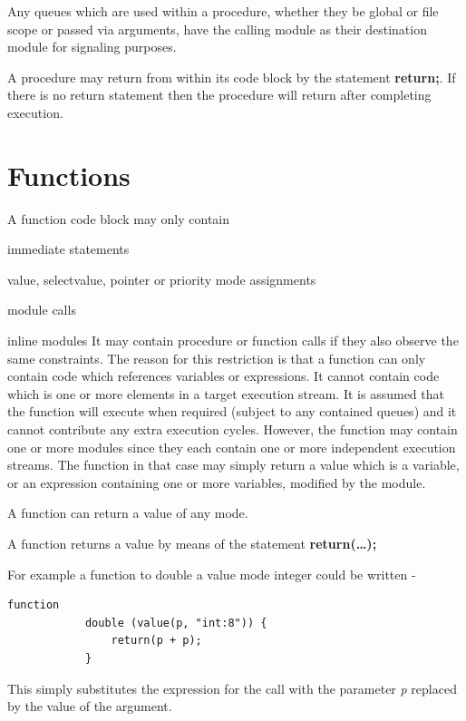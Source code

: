        Any queues which are used within a procedure, whether they be global or
        file scope or passed via arguments, have the calling module as their
        destination module for signaling purposes.
        
        A procedure may return from within its code block by the
        statement {\bf return;}. If there is no return statement then the procedure
        will return after completing execution.
        








    \section{Functions}


        A function code block may only contain
        \blist
        \item   immediate statements
        \item   value, selectvalue, pointer or priority mode assignments
        \item   module calls
        \item   inline modules
        \blend
        It may contain procedure or function calls if they also observe the
        same constraints. The reason for this restriction is that a function
        can only contain code which references variables or expressions. It
        cannot contain code which is one or more elements in a target
        execution stream. It is assumed that the function will execute when
        required (subject to any contained queues) and it cannot contribute
        any extra execution cycles. However, the function may  contain one or
        more modules since they each contain one or more independent
        execution streams. The function in that case may simply
        return a value which is a variable, or an expression containing one or
        more variables, modified by the module.
        
        A function can return a value of any mode.
        
        A function returns a value by means of the statement {\bf
        return(\dots);}

        For example a function to double a value mode integer could be written -
        \begin{lstlisting}[gobble=8, language=threepl]
            function
            double (value(p, "int:8")) {
                return(p + p);
            }
        \end{lstlisting}
        This simply substitutes the expression for the call with the parameter
        {\em p} replaced by the value of the argument.
        
